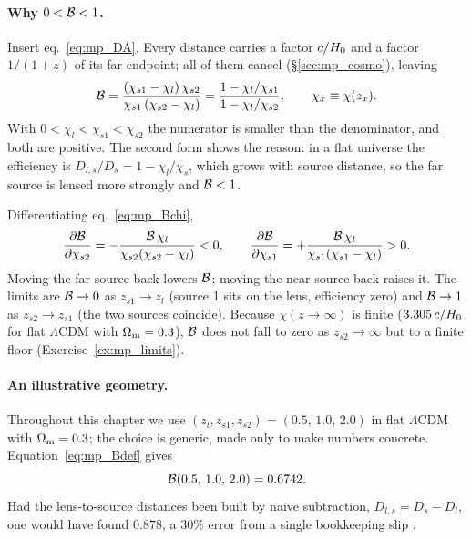 \paragraph{Why $0<\mathcal{B}<1$.}  Insert eq.~\eqref{eq:mp_DA}.  Every
distance carries a factor $c/H_0$ and a factor $1/(1+z)$ of its far
endpoint; all of them cancel (\S\ref{sec:mp_cosmo}), leaving
\begin{equation}
  \mathcal{B} = \frac{(\chi_{s1}-\chi_l)\,\chi_{s2}}{\chi_{s1}\,(\chi_{s2}-\chi_l)}
        = \frac{1-\chi_l/\chi_{s1}}{1-\chi_l/\chi_{s2}} ,
  \qquad \chi_x\equiv\chi(z_x).
  \label{eq:mp_Bchi}
\end{equation}
With $0<\chi_l<\chi_{s1}<\chi_{s2}$ the numerator is smaller than the
denominator, and both are positive.  The second form shows the
reason: in a flat universe the efficiency is
$D_{l,s}/D_s=1-\chi_l/\chi_s$, which grows with source distance, so the
far source is lensed more strongly and $\mathcal{B}<1$.  

\begin{derivation}
Differentiating eq.~\eqref{eq:mp_Bchi},
\[
  \frac{\partial \mathcal{B}}{\partial \chi_{s2}} = -\frac{\mathcal{B}\,\chi_l}{\chi_{s2}(\chi_{s2}-\chi_l)}<0,
  \qquad
  \frac{\partial \mathcal{B}}{\partial \chi_{s1}} = +\frac{\mathcal{B}\,\chi_l}{\chi_{s1}(\chi_{s1}-\chi_l)}>0 .
\]
Moving the far source back lowers $\mathcal{B}$; moving the near source back
raises it.  The limits are $\mathcal{B}\to0$ as $z_{s1}\to z_l$ (source 1 sits
on the lens, efficiency zero) and $\mathcal{B}\to1$ as $z_{s2}\to z_{s1}$ (the
two sources coincide).  Because $\chi(z\to\infty)$ is finite
($3.305\,c/H_0$ for flat $\Lambda$CDM with $\Omega_{\mathrm{m}}=0.3$), $\mathcal{B}$
does not fall to zero as $z_{s2}\to\infty$ but to a finite floor
(Exercise~\ref{ex:mp_limits}).  
\end{derivation}

\paragraph{An illustrative geometry.}  Throughout this chapter we use
$(z_l,z_{s1},z_{s2})=(0.5,\,1.0,\,2.0)$ in flat $\Lambda$CDM with
$\Omega_{\mathrm{m}}=0.3$; the choice is generic, made only to make numbers
concrete.  Equation~\eqref{eq:mp_Bdef} gives
\begin{equation}
  \mathcal{B}(0.5,\,1.0,\,2.0) = 0.6742 .
  \label{eq:mp_Bnum}
\end{equation}
  Had the lens-to-source distances been built by naive
subtraction, $D_{l,s}=D_s-D_l$, one would have found $0.878$, a
$30\%$ error from a single bookkeeping slip .



